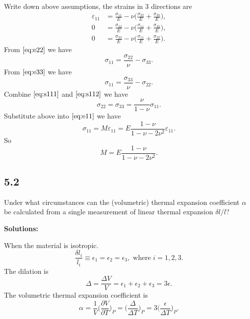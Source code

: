\documentclass[12pt]{article}
\begin{document}
Write down above assumptions, the strains in $3$ directions are
\begin{align}
	\varepsilon_{11} & = \frac{\sigma_{11}}{E} - \nu \bigg( \frac{ \sigma_{22} }{ E } + \frac{ \sigma_{33} }{ E } \bigg), \label{eq:e11} \\
	0                & = \frac{\sigma_{22}}{E} - \nu \bigg( \frac{ \sigma_{11} }{ E } + \frac{ \sigma_{33} }{ E } \bigg), \label{eq:e22} \\
	0                & = \frac{\sigma_{33}}{E} - \nu \bigg( \frac{ \sigma_{11} }{ E } + \frac{ \sigma_{22} }{ E } \bigg). \label{eq:e33}
\end{align}
From $\eqref{eq:e22}$ we have
\begin{equation}\label{eq:s111}
	\sigma_{11} = \frac{ \sigma_{22} }{ \nu } - \sigma_{33}.
\end{equation}
From $\eqref{eq:e33}$ we have
\begin{equation}\label{eq:s112}
	\sigma_{11} = \frac{\sigma_{33}}{\nu} - \sigma_{22}.
\end{equation}
Combine $\eqref{eq:s111}$ and $\eqref{eq:s112}$ we have
\begin{equation}
	\sigma_{22} = \sigma_{33} = \frac{\nu}{1 - \nu} \sigma_{11}.
\end{equation}
Substitute above into $\eqref{eq:e11}$ we have
\begin{equation}
	\sigma_{11} = M \varepsilon_{11} = E \frac{1 - \nu}{1 - \nu - 2\nu^2} \varepsilon_{11}.
\end{equation}
So
\begin{equation}
	M = E \frac{1 - \nu}{1 - \nu - 2\nu^2}.
\end{equation}

\subsection{5.2}
Under what circumstances can the (volumetric) thermal expansion coefficient $\alpha$ be calculated from a single measurement of linear thermal expansion $\delta l/l$?

\textbf{Solutions:}

When the material is isotropic.
\begin{equation}
	\frac{ \delta l_i }{ l_i } \equiv \epsilon_1 = \epsilon_2 = \epsilon_3, \text{ where } i = 1, 2, 3.
\end{equation}
The dilation is
\begin{equation}
	\Delta = \frac{\Delta V}{V} = \epsilon_1 + \epsilon_2 + \epsilon_3 = 3 \epsilon.
\end{equation}
The volumetric thermal expansion coefficient is
\begin{equation}
	\alpha = \frac{1}{V} \bigg( \frac{\partial V}{\partial T} \bigg)_P = \bigg( \frac{ \Delta }{ \Delta T } \bigg)_P = 3 \bigg( \frac{ \epsilon }{ \Delta T } \bigg)_P.
\end{equation}
\end{document}
